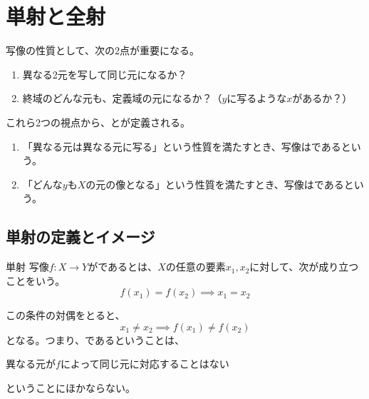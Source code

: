 \documentclass[../../../topic_linear-algebra]{subfiles}
\begin{document}
\sectionline
\section{単射と全射}

写像の性質として、次の2点が重要になる。
\begin{enumerate}[label=\romanlabel]
  \item 異なる2元を写して同じ元になるか？
  \item 終域のどんな元も、定義域の元になるか？（$y$に写るような$x$があるか？）
\end{enumerate}

これら2つの視点から、とが定義される。
\begin{enumerate}[label=\romanlabel]
  \item 「異なる元は異なる元に写る」という性質を満たすとき、写像はであるという。
  \item 「どんな$y$も$X$の元の像となる」という性質を満たすとき、写像はであるという。
\end{enumerate}

\subsection{単射の定義とイメージ}

\begin{definition*}{単射}
  写像$f\colon X \to Y$がであるとは、$X$の任意の要素$x_1, x_2$に対して、次が成り立つことをいう。
  \begin{equation*}
    f(x_1) = f(x_2) \implies x_1 = x_2
  \end{equation*}
\end{definition*}

この条件の対偶をとると、
\begin{equation*}
  x_1 \ne x_2 \implies f(x_1) \ne f(x_2)
\end{equation*}
となる。つまり、であるということは、
\begin{emphabox}
  \begin{spacebox}
    \begin{center}
      異なる元が$f$によって同じ元に対応することはない
    \end{center}
  \end{spacebox}
\end{emphabox}
ということにほかならない。
\end{document}
